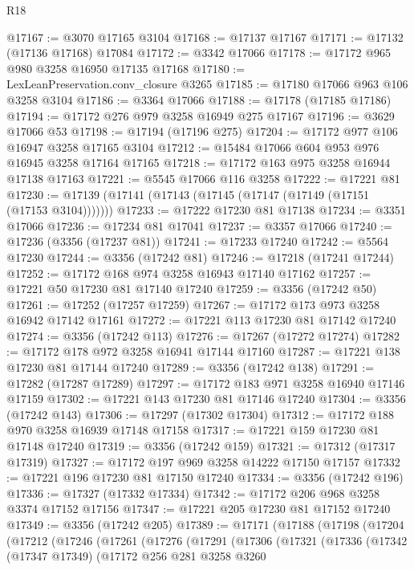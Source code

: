 \begin{lexlean}{R18}
\begin{coremodule}
@17167 := @3070 @17165 @3104
@17168 := @17137 @17167
@17171 := @17132 (@17136 @17168) @17084
@17172 := @3342 @17066
@17178 := @17172 @965 @980 @3258 @16950 @17135 @17168
@17180 := LexLeanPreservation.conv_closure @3265
@17185 := @17180 @17066 @963 @106 @3258 @3104
@17186 := @3364 @17066
@17188 := @17178 (@17185 @17186)
@17194 := @17172 @276 @979 @3258 @16949 @275 @17167
@17196 := @3629 @17066 @53
@17198 := @17194 (@17196 @275)
@17204 := @17172 @977 @106 @16947 @3258 @17165 @3104
@17212 := @15484 @17066 @604 @953 @976 @16945 @3258 @17164 @17165
@17218 := @17172 @163 @975 @3258 @16944 @17138 @17163
@17221 := @5545 @17066 @116 @3258
@17222 := @17221 @81
@17230 := @17139 (@17141 (@17143 (@17145 (@17147 (@17149 (@17151 (@17153 @3104)))))))
@17233 := @17222 @17230 @81 @17138
@17234 := @3351 @17066
@17236 := @17234 @81 @17041
@17237 := @3357 @17066
@17240 := @17236 (@3356 (@17237 @81))
@17241 := @17233 @17240
@17242 := @5564 @17230
@17244 := @3356 (@17242 @81)
@17246 := @17218 (@17241 @17244)
@17252 := @17172 @168 @974 @3258 @16943 @17140 @17162
@17257 := @17221 @50 @17230 @81 @17140 @17240
@17259 := @3356 (@17242 @50)
@17261 := @17252 (@17257 @17259)
@17267 := @17172 @173 @973 @3258 @16942 @17142 @17161
@17272 := @17221 @113 @17230 @81 @17142 @17240
@17274 := @3356 (@17242 @113)
@17276 := @17267 (@17272 @17274)
@17282 := @17172 @178 @972 @3258 @16941 @17144 @17160
@17287 := @17221 @138 @17230 @81 @17144 @17240
@17289 := @3356 (@17242 @138)
@17291 := @17282 (@17287 @17289)
@17297 := @17172 @183 @971 @3258 @16940 @17146 @17159
@17302 := @17221 @143 @17230 @81 @17146 @17240
@17304 := @3356 (@17242 @143)
@17306 := @17297 (@17302 @17304)
@17312 := @17172 @188 @970 @3258 @16939 @17148 @17158
@17317 := @17221 @159 @17230 @81 @17148 @17240
@17319 := @3356 (@17242 @159)
@17321 := @17312 (@17317 @17319)
@17327 := @17172 @197 @969 @3258 @14222 @17150 @17157
@17332 := @17221 @196 @17230 @81 @17150 @17240
@17334 := @3356 (@17242 @196)
@17336 := @17327 (@17332 @17334)
@17342 := @17172 @206 @968 @3258 @3374 @17152 @17156
@17347 := @17221 @205 @17230 @81 @17152 @17240
@17349 := @3356 (@17242 @205)
@17389 := @17171
    (@17188
      (@17198
        (@17204
          (@17212
            (@17246
              (@17261
                (@17276
                  (@17291
                    (@17306
                      (@17321
                        (@17336
                          (@17342
                            (@17347 @17349)
                            (@17172
                              @256
                              @281
                              @3258
                              @3260

\end{coremodule}
\end{lexlean}
